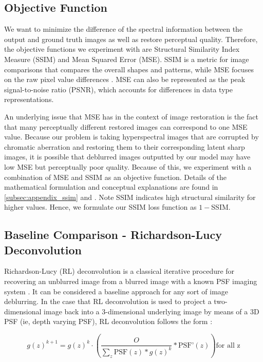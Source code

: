 \documentclass{article}
\begin{document}
\subsection{Objective Function}
We want to minimize the difference of the spectral information between the output and ground truth images as well as restore perceptual quality. Therefore, the objective functions we experiment with are Structural Similarity Index Measure (SSIM) and Mean Squared Error (MSE). SSIM is a metric for image comparisons that compares the overall shapes and patterns, while MSE focuses on the raw pixel value differences \cite{Brunet_Vrscay_Wang_2011}. MSE can also be represented as the peak signal-to-noise ratio (PSNR), which accounts for differences in data type representations.

An underlying issue that MSE has in the context of image restoration is the fact that many perceptually different restored images can correspond to one MSE value. Because our problem is taking hyperspectral images that are corrupted by chromatic aberration and restoring them to their corresponding latent sharp images, it is possible that deblurred images outputted by our model may have low MSE but perceptually poor quality. Because of this, we experiment with a combination of MSE and SSIM as an objective function. Details of the mathematical formulation and conceptual explanations are found in \ref{subsec:appendix_ssim} and \cite{Brunet_Vrscay_Wang_2011}. Note SSIM indicates high structural similarity for higher values. Hence, we formulate our SSIM loss function as $1 - $SSIM.

\subsection{Baseline Comparison - Richardson-Lucy Deconvolution}
Richardson-Lucy (RL) deconvolution is a classical iterative procedure for recovering an unblurred image from a blurred image with a known PSF imaging system \cite{lucy1974iterative,richardson1972bayesian}. It can be considered a baseline approach for any sort of image deblurring. In the case that RL deconvolution is used to project a two-dimensional image back into a 3-dimensional underlying image by means of a 3D PSF (ie, depth varying PSF), RL deconvolution follows the form \cite{broxton2013wave,guo2019fourier}:

\begin{equation}
    g(z)^{k+1} = g(z)^{k} \cdot \left(\frac{O}{\sum_{z} \text{PSF}(z) \ast g(z)^{k} } \ast \text{PSF'}(z)\right)\text{for all z}
    \label{eq:RL}
\end{equation}
\end{document}
